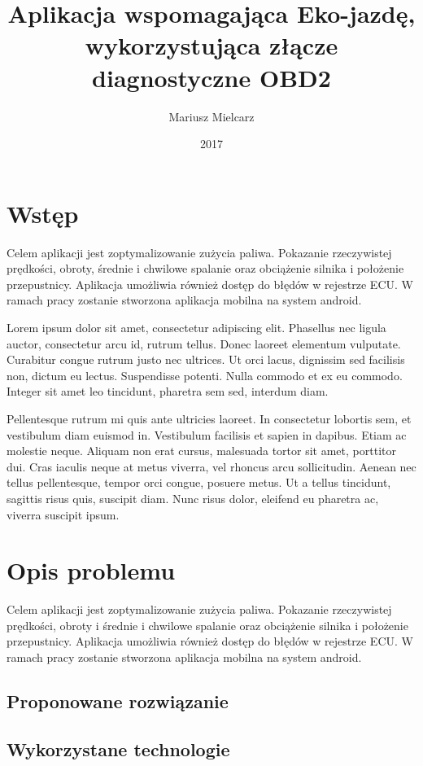 \documentclass[wmii,inf,mgr]{uwmthesis}
\date{2017}
\title{Aplikacja wspomagająca Eko-jazdę, wykorzystująca złącze diagnostyczne OBD2}
\author{Mariusz Mielcarz}
\begin{document}
	
\maketitle

	
\tableofcontents

\chapter*{Wstęp}
Celem aplikacji jest zoptymalizowanie  zużycia paliwa.
Pokazanie rzeczywistej prędkości, obroty,  średnie i chwilowe spalanie oraz obciążenie silnika i położenie przepustnicy.
Aplikacja umożliwia również dostęp do błędów w rejestrze ECU.
W ramach pracy zostanie stworzona aplikacja mobilna  na system android.

Lorem ipsum dolor sit amet, consectetur adipiscing elit. Phasellus nec ligula auctor, consectetur arcu id, rutrum tellus. Donec laoreet elementum vulputate. Curabitur congue rutrum justo nec ultrices. Ut orci lacus, dignissim sed facilisis non, dictum eu lectus. Suspendisse potenti. Nulla commodo et ex eu commodo. Integer sit amet leo tincidunt, pharetra sem sed, interdum diam. 

Pellentesque rutrum mi quis ante ultricies laoreet. In consectetur lobortis sem, et vestibulum diam euismod in. Vestibulum facilisis et sapien in dapibus. Etiam ac molestie neque. Aliquam non erat cursus, malesuada tortor sit amet, porttitor dui. Cras iaculis neque at metus viverra, vel rhoncus arcu sollicitudin. Aenean nec tellus pellentesque, tempor orci congue, posuere metus. Ut a tellus tincidunt, sagittis risus quis, suscipit diam. Nunc risus dolor, eleifend eu pharetra ac, viverra suscipit ipsum.

\chapter{Opis problemu}
Celem aplikacji jest zoptymalizowanie  zużycia paliwa.
Pokazanie rzeczywistej prędkości, obroty i średnie i chwilowe spalanie oraz obciążenie silnika i położenie przepustnicy.
Aplikacja umożliwia również dostęp do błędów w rejestrze ECU.
W ramach pracy zostanie stworzona aplikacja mobilna  na system android.
\section{Proponowane rozwiązanie}
\section{Wykorzystane technologie}
\end{document}
